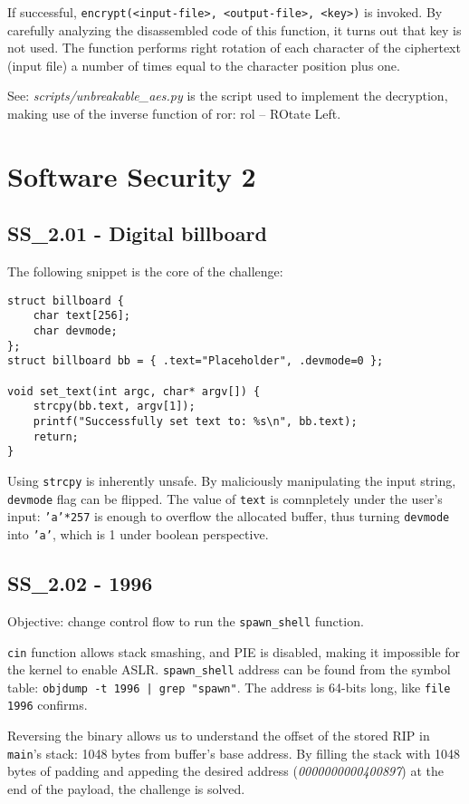 If successful, \texttt{encrypt(<input-file>, <output-file>, <key>)} is invoked.
By carefully analyzing the disassembled code of this function, it turns out that key is not used.
The function performs right rotation of each character of the ciphertext (input file) a number of times equal to the character position plus one.

See: \textit{scripts/unbreakable_aes.py} is the script used to implement the decryption, making use of the inverse function of ror: rol -- ROtate Left.

\section{Software Security 2}
\subsection{SS_2.01 - Digital billboard}
The following snippet is the core of the challenge:
\begin{verbatim}
struct billboard {
    char text[256];
    char devmode;
};
struct billboard bb = { .text="Placeholder", .devmode=0 };

void set_text(int argc, char* argv[]) {
    strcpy(bb.text, argv[1]);
    printf("Successfully set text to: %s\n", bb.text);
    return;
}
\end{verbatim}

Using \texttt{strcpy} is inherently unsafe.
By maliciously manipulating the input string, \texttt{devmode} flag can be flipped.
The value of \texttt{text} is comnpletely under the user's input: \texttt{'a'*257} is enough to overflow the allocated buffer, thus turning \texttt{devmode} into \texttt{'a'}, which is 1 under boolean perspective.

\subsection{SS_2.02 - 1996}
Objective: change control flow to run the \texttt{spawn_shell} function.

\texttt{cin} function allows stack smashing, and PIE is disabled, making it impossible for the kernel to enable ASLR.
\texttt{spawn_shell} address can be found from the symbol table: \texttt{objdump -t 1996 | grep "spawn"}.
The address is 64-bits long, like \texttt{file 1996} confirms.

Reversing the binary allows us to understand the offset of the stored RIP in \texttt{main}'s stack: 1048 bytes from buffer's base address.
By filling the stack with 1048 bytes of padding and appeding the desired address (\textit{0000000000400897}) at the end of the payload, the challenge is solved.

